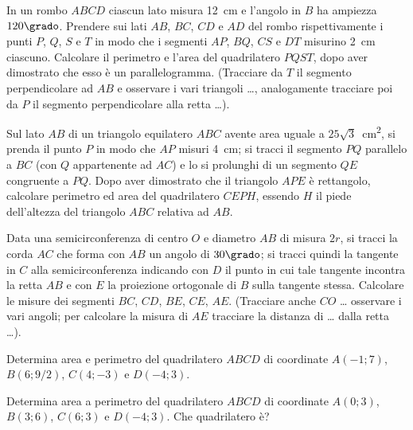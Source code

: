 \begin{multicols}{2}
\begin{esercizio}
\label{ese:7.88}
In un rombo $ABCD$ ciascun lato misura 12~cm e l'angolo in $B$ ha 
ampiezza $120\grado$. Prendere sui lati $AB$, $BC$, $CD$ e $AD$ del 
rombo rispettivamente i punti $P$, $Q$, $S$ e $T$ in modo che i 
segmenti $AP$, $BQ$, $CS$ e $DT$ misurino 2~cm ciascuno. Calcolare il 
perimetro e l'area del quadrilatero $PQST$, dopo aver dimostrato che 
esso è un parallelogramma. (Tracciare da $T$ il segmento 
perpendicolare ad $AB$ e osservare i vari triangoli \ldots{}, 
analogamente tracciare poi da $P$ il segmento perpendicolare alla 
retta \ldots{}).  
\end{esercizio}

\begin{esercizio}
\label{ese:7.89}
Sul lato $AB$ di un triangolo equilatero $ABC$ avente area uguale a 
$25\sqrt{3}$~cm\textsuperscript{2}, si prenda il punto $P$ in modo 
che $AP$ misuri 4~cm; si tracci il segmento $PQ$ parallelo a $BC$ (con 
$Q$ appartenente ad $AC$) e lo si prolunghi di un segmento $QE$ 
congruente a $PQ$. Dopo aver dimostrato che il triangolo $APE$ è 
rettangolo, calcolare perimetro ed area del quadrilatero $CEPH$, 
essendo $H$ il piede dell'altezza del triangolo $ABC$ relativa ad 
$AB$.
\end{esercizio}

\begin{esercizio}
\label{ese:7.90}
Data una semicirconferenza di centro $O$ e diametro $AB$ di misura 
$2r$, si tracci la corda $AC$ che forma con $AB$ un angolo di 
$30\grado$; si tracci quindi la tangente in $C$ alla 
semicirconferenza indicando con $D$ il punto in cui tale tangente 
incontra la retta $AB$ e con $E$ la proiezione ortogonale di $B$ sulla 
tangente stessa. Calcolare le misure dei segmenti $BC$, $CD$, $BE$, 
$CE$, $AE$. (Tracciare anche $CO$ \ldots{} osservare i vari angoli; 
per calcolare la misura di $AE$ tracciare la distanza di \ldots{} 
dalla retta \ldots{}).
\end{esercizio}

\begin{esercizio}
\label{ese:7.91}
Determina area e perimetro del quadrilatero $ABCD$ di coordinate 
$A(-1;7)$, $B(6;9/2)$, $C(4;-3)$ e $D(-4;3)$.
\end{esercizio}

\begin{esercizio}
\label{ese:7.92}
Determina area a perimetro del quadrilatero $ABCD$ di coordinate 
$A(0;3)$, $B(3;6)$, $C(6;3)$ e $D(-4;3)$. Che quadrilatero è?
\end{esercizio}


\end{multicols}
